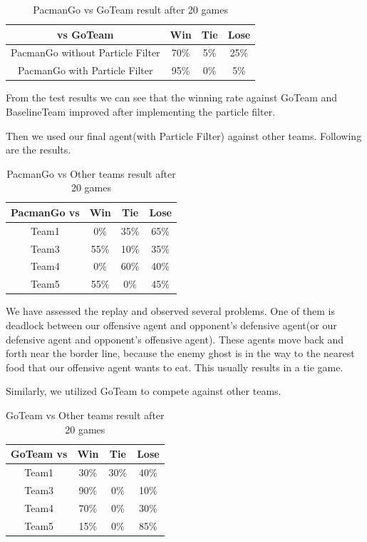 \begin{table}[!htb]
  \caption{PacmanGo vs GoTeam result after 20 games}
  \label{5}
  \begin{tabular}{c|ccc}
    \toprule
    vs GoTeam & Win & Tie & Lose \\
    \midrule
    PacmanGo without Particle Filter & 70\% & 5\% & 25\%\\
    PacmanGo with Particle Filter & 95\% & 0\% & 5\%\\
    
  \bottomrule
\end{tabular}
\end{table}

From the test results we can see that the winning rate against GoTeam and BaselineTeam
improved after implementing the particle filter.

Then we used our final agent(with Particle Filter) against other teams.  Following are the results.

\begin{table}[!htb]
  \caption{PacmanGo vs Other teams result after 20 games}
  \label{6}
  \begin{tabular}{c|ccc}
    \toprule
    PacmanGo vs & Win & Tie & Lose \\
    \midrule
    Team1 & 0\% & 35\% & 65\%\\
    Team3 & 55\% & 10\% & 35\%\\
    Team4 & 0\% & 60\% & 40\%\\
    Team5 & 55\% & 0\% & 45\%\\
    
  \bottomrule
\end{tabular}
\end{table}

We have assessed the replay and observed several problems. 
One of them is deadlock between our offensive agent and opponent’s 
defensive agent(or our defensive agent and opponent’s offensive agent). 
These agents move back and forth near the border line, because the 
enemy ghost is in the way to the nearest food that our offensive 
agent wants to eat. This usually results in a tie game. 

Similarly, we utilized GoTeam to compete against other teams.

\begin{table}[!htb]
  \caption{GoTeam vs Other teams result after 20 games}
  \label{7}
  \begin{tabular}{c|ccc}
    \toprule
    GoTeam vs & Win & Tie & Lose \\
    \midrule
    Team1 & 30\% & 30\% & 40\%\\
    Team3 & 90\% & 0\% & 10\%\\
    Team4 & 70\% & 0\% & 30\%\\
    Team5 & 15\% & 0\% & 85\%\\
    
  \bottomrule
\end{tabular}
\end{table}

